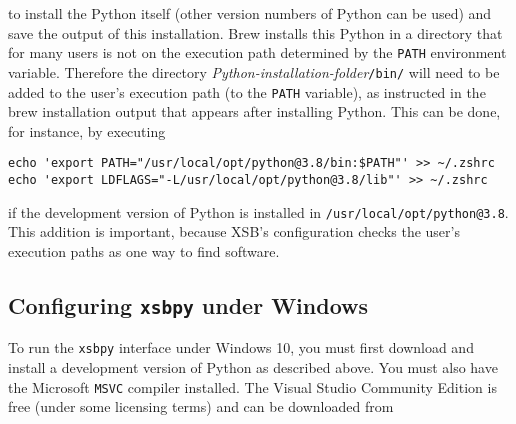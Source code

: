 \noindent
to install the Python itself (other version numbers of Python can be used)
and save the output of this installation.  Brew installs this Python in a
directory that for many users is not on the execution path determined by
the \texttt{PATH} environment variable.  Therefore the directory
\emph{Python-installation-folder}\texttt{/bin/} will need to be added to
the user's execution path (to the \texttt{PATH} variable), as instructed in
the brew installation output that appears after installing Python.
This can be done, for instance, by executing
\begin{verbatim}
echo 'export PATH="/usr/local/opt/python@3.8/bin:$PATH"' >> ~/.zshrc
echo 'export LDFLAGS="-L/usr/local/opt/python@3.8/lib"' >> ~/.zshrc
\end{verbatim}
if the development version of
Python is installed in \texttt{/usr/local/opt/python@3.8}. This
addition is important, because XSB's configuration checks the user's
execution paths as one way to find software.

%
%
%
%
%
\subsection{Configuring {\tt xsbpy} under Windows}

To run the {\tt xsbpy} interface under Windows 10, you must first
download and install a development version of Python as described
above.  You must also have the Microsoft {\tt MSVC} compiler
installed.  The Visual Studio Community Edition is free (under some
licensing terms) and can be downloaded from

